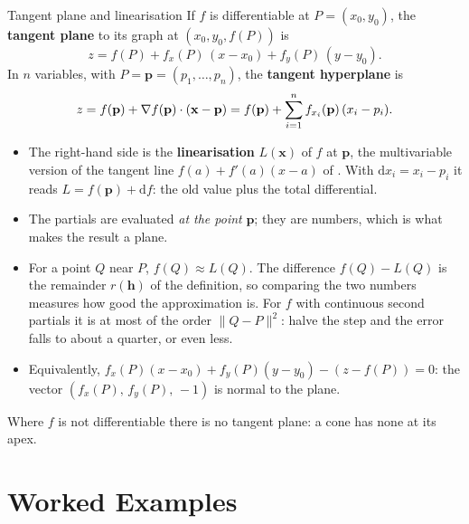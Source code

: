\begin{rulebox}{Tangent plane and linearisation}
If $f$ is differentiable at $P=(x_{0},y_{0})$, the \textbf{tangent plane}
 to its graph at $(x_{0},y_{0},f(P))$ is
\[
  z=f(P)+f_{x}(P)\,(x-x_{0})+f_{y}(P)\,(y-y_{0}) .
\]
In $n$ variables, with $P=\mathbf{p}=(p_{1},\ldots,p_{n})$, the
\textbf{tangent hyperplane} is
\[
  z=f(\mathbf{p})+\nabla f(\mathbf{p})\cdot(\mathbf{x}-\mathbf{p})
   =f(\mathbf{p})+\sum_{i=1}^{n}f_{x_i}(\mathbf{p})\,(x_{i}-p_{i}) .
\]
\begin{itemize}[leftmargin=1.6em,itemsep=0.3ex]
  \item The right-hand side is the \textbf{linearisation} $L(\mathbf{x})$
        of $f$ at $\mathbf{p}$, the multivariable version of the tangent
        line $f(a)+f'(a)(x-a)$ of . With
        $\mathrm{d}x_{i}=x_{i}-p_{i}$ it reads $L=f(\mathbf{p})+\mathrm{d}f$:
        the old value plus the total differential.
  \item The partials are evaluated \emph{at the point} $\mathbf{p}$; they
        are numbers, which is what makes the result a plane.
  \item For a point $Q$ near $P$, $f(Q)\approx L(Q)$. The difference
        $f(Q)-L(Q)$ is the remainder $r(\mathbf{h})$ of the definition, so
        comparing the two numbers measures how good the approximation is.
        For $f$ with continuous second partials it is at most of the order
        $\|Q-P\|^{2}$: halve the step and the error falls to about a
        quarter, or even less.
  \item Equivalently, $f_{x}(P)(x-x_{0})+f_{y}(P)(y-y_{0})-(z-f(P))=0$: the
        vector $(f_{x}(P),\,f_{y}(P),\,-1)$ is normal to the plane.
\end{itemize}
Where $f$ is not differentiable there is no tangent plane: a cone has none
at its apex.
\end{rulebox}

\section{Worked Examples}

